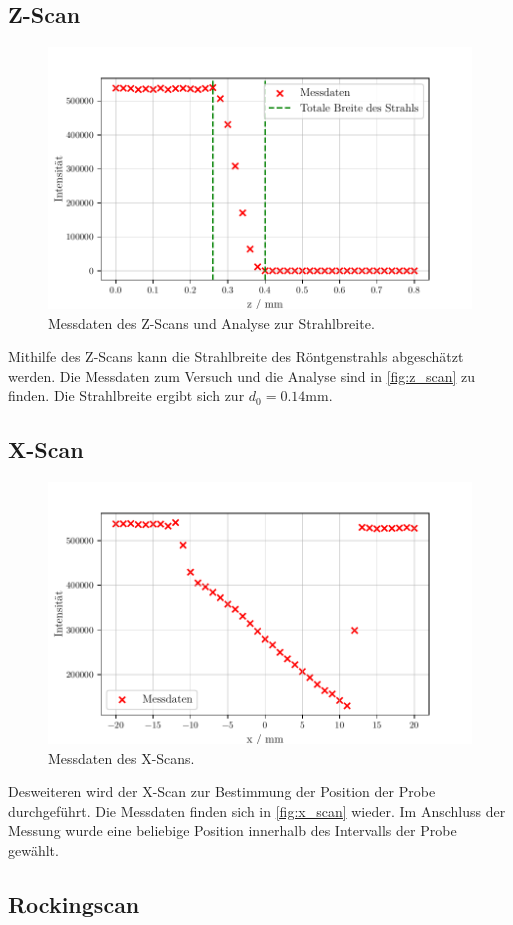 \subsection{Z-Scan}

\begin{figure}
    \centering
    \includegraphics[width = 0.5 \linewidth]{build/z_scan.pdf}
    \caption{Messdaten des Z-Scans und Analyse zur Strahlbreite.}
    \label{fig:z_scan}
\end{figure}

Mithilfe des Z-Scans kann die Strahlbreite des Röntgenstrahls abgeschätzt werden.
Die Messdaten zum Versuch und die Analyse sind in \autoref{fig:z_scan} zu finden.
Die Strahlbreite ergibt sich zur $d_0 = 0.14 \unit{\milli\meter}$.

\subsection{X-Scan}

\begin{figure}
    \centering
    \includegraphics[width = 0.5 \linewidth]{build/x_scan.pdf}
    \caption{Messdaten des X-Scans.}
    \label{fig:x_scan}
\end{figure}

Desweiteren wird der X-Scan zur Bestimmung der Position der Probe durchgeführt.
Die Messdaten finden sich in \autoref{fig:x_scan} wieder.
Im Anschluss der Messung wurde eine beliebige Position innerhalb des Intervalls der Probe gewählt.

\subsection{Rockingscan}

